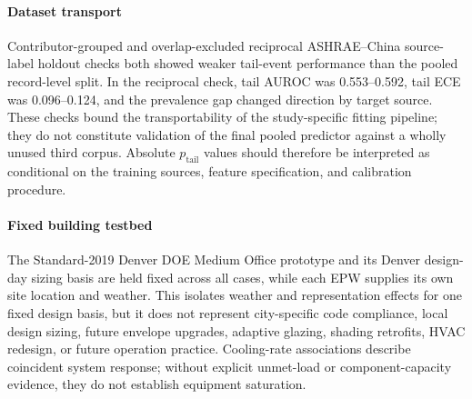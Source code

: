 \paragraph{Dataset transport}
Contributor-grouped and overlap-excluded reciprocal ASHRAE--China source-label holdout checks both showed weaker tail-event performance than the pooled record-level split. In the reciprocal check, tail AUROC was 0.553--0.592, tail ECE was 0.096--0.124, and the prevalence gap changed direction by target source. These checks bound the transportability of the study-specific fitting pipeline; they do not constitute validation of the final pooled predictor against a wholly unused third corpus. Absolute $p_{\mathrm{tail}}$ values should therefore be interpreted as conditional on the training sources, feature specification, and calibration procedure.

\paragraph{Fixed building testbed}
The Standard-2019 Denver DOE Medium Office prototype and its Denver design-day sizing basis are held fixed across all cases, while each EPW supplies its own site location and weather. This isolates weather and representation effects for one fixed design basis, but it does not represent city-specific code compliance, local design sizing, future envelope upgrades, adaptive glazing, shading retrofits, HVAC redesign, or future operation practice. Cooling-rate associations describe coincident system response; without explicit unmet-load or component-capacity evidence, they do not establish equipment saturation.

